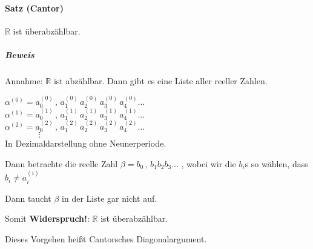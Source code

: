 \documentclass[14pt,a4paper]{article}
\begin{document}
  \paragraph{Satz (Cantor)}
  $\mathbb{R}$ ist überabzählbar.
  \subparagraph{Beweis}
  Annahme: $\mathbb{R}$ ist abzählbar.
  Dann gibt es eine Liste aller reeller Zahlen.

  $ \alpha^{(0)} = a_0^{(0)}\,,\, a_1^{(0)} \, a^{(0)}_2 \, a_3^{(0)} \,
  a_4^{(0)} \ldots \, $ \\
  
  $ \alpha^{(1)} = a_0^{(1)}\,,\, a_1^{(1)} \, a^{(1)}_2 \, a_3^{(1)} \,
  a_4^{(1)} \ldots \, $ \\

  $ \alpha^{(2)} = a_0^{(2)}\,,\, a_1^{(2)} \, a^{(2)}_2 \, a_3^{(2)} \,
  a_4^{(2)} \ldots \, $ \\

  $\quad \quad \quad \quad \vdots$ \\


  In Dezimaldarstellung ohne Neunerperiode.


  Dann betrachte die reelle Zahl $ \beta = b_0 \,,\, b_1 b_2 b_3 \ldots$ , wobei wir
  die $ b_i$s so wählen, dass $ b_i \neq a_i^{(i)}$

  Dann taucht $ \beta $ in der Liste gar nicht auf.

  Somit \textbf{Widerspruch!}: $ \mathbb{R} $ ist überabzählbar.

  Dieses Vorgehen heißt Cantorsches Diagonalargument.
\end{document}
